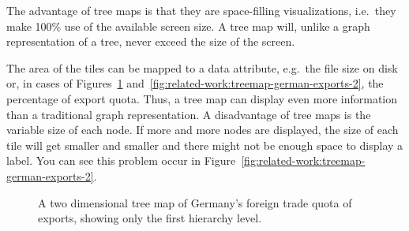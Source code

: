 The advantage of tree maps is that they are space-filling visualizations, i.e.\ they make 100\% use of the available screen size.
A tree map will, unlike a graph representation of a tree, never exceed the size of the screen.

The area of the tiles can be mapped to a data attribute, e.g.\ the file size on disk or, in cases of Figures~\ref{fig:related-work:treemap-german-exports-1} and~\ref{fig:related-work:treemap-german-exports-2}, the percentage of export quota.
Thus, a tree map can display even more information than a traditional graph representation.
A disadvantage of tree maps is the variable size of each node.
If more and more nodes are displayed, the size of each tile will get smaller and smaller and there might not be enough space to display a label.
You can see this problem occur in Figure~\ref{fig:related-work:treemap-german-exports-2}.
\begin{figure}[ht]
    \centering
    \caption{A two dimensional tree map of Germany's foreign trade quota of exports, showing only the first hierarchy level.}
    \label{fig:related-work:treemap-german-exports-1}
\end{figure}

